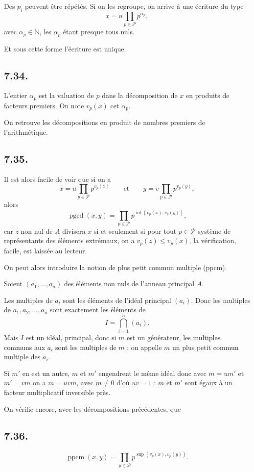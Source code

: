 Des $p_i$ peuvent être répétés. Si on les regroupe, on arrive à une écriture du type
\[
x=u\prod_{p\in\mathcal P}p^{\alpha_p},
\]
avec $\alpha_p\in\mathbb N$, les $\alpha_p$ étant presque tous nuls.

Et sous cette forme l'écriture est unique.

\subsection*{7.34.}

L'entier $\alpha_p$ est la valuation de $p$ dans la décomposition de $x$ en produits de facteurs premiers. On note $v_p(x)$ cet $\alpha_p$.

On retrouve les décompositions en produit de nombres premiers de l'arithmétique.

\subsection*{7.35.}

Il est alors facile de voir que si on a
\[
x=u\prod_{p\in\mathcal P}p^{v_p(x)}\qquad\text{et}\qquad y=v\prod_{p\in\mathcal P}p^{v_p(y)},
\]
alors
\[
\operatorname{pgcd}(x,y)=\prod_{p\in\mathcal P}p^{\inf(v_p(x),v_p(y))},
\]
car $z$ non nul de $A$ divisera $x$ si et seulement si pour tout $p\in\mathcal P$ système de représentants des éléments extrémaux, on a $v_p(z)\le v_p(x)$, la vérification, facile, est laissée au lecteur.

On peut alors introduire la notion de plus petit commun multiple (ppcm).

Soient $(a_1,\ldots,a_n)$ des éléments non nuls de l'anneau principal $A$.

Les multiples de $a_i$ sont les éléments de l'idéal principal $(a_i)$. Donc les multiples de $a_1,a_2,\ldots,a_n$ sont exactement les éléments de
\[
I=\bigcap_{i=1}^n(a_i).
\]
Mais $I$ est un idéal, principal, donc si $m$ est un générateur, les multiples communs aux $a_i$ sont les multiples de $m$ : on appelle $m$ un plus petit commun multiple des $a_i$.

Si $m'$ en est un autre, $m$ et $m'$ engendrent le même idéal donc avec $m=um'$ et $m'=vm$ on a $m=uvm$, avec $m\ne0$ d'où $uv=1$ : $m$ et $m'$ sont égaux à un facteur multiplicatif inversible près.

On vérifie encore, avec les décompositions précédentes, que

\subsection*{7.36.}
\[
\operatorname{ppcm}(x,y)=\prod_{p\in\mathcal P}p^{\sup(v_p(x),v_p(y))}.
\]

